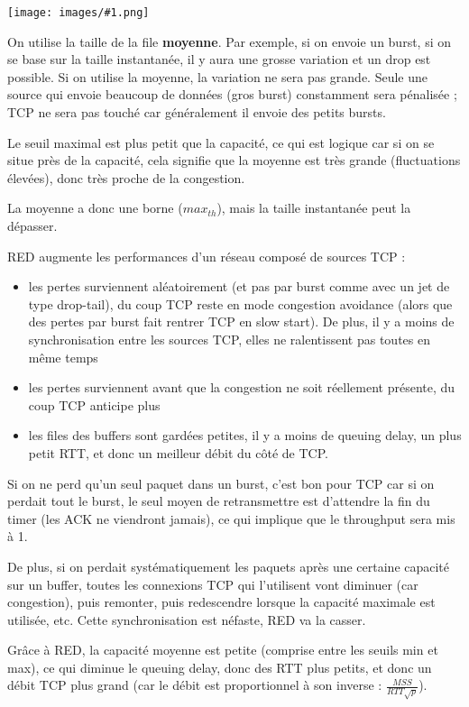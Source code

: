 \documentclass[10pt,a4paper]{report}
\newcommand{\dessin}[1]{\begin{center}\texttt{[image: images/\#1.png]}\end{center}}
\begin{document}
			\dessin{111}
			
			On utilise la taille de la file \textbf{moyenne}. Par exemple, si on envoie un burst, si on se base sur la taille instantanée, il y aura une grosse variation et un drop est possible. Si on utilise la moyenne, la variation ne sera pas grande. Seule une source qui envoie beaucoup de données (gros burst) constamment sera pénalisée ; TCP ne sera pas touché car généralement il envoie des petits bursts.
			
			Le seuil maximal est plus petit que la capacité, ce qui est logique car si on se situe près de la capacité, cela signifie que la moyenne est très grande (fluctuations élevées), donc très proche de la congestion.
			
			La moyenne a donc une borne ($max_{th}$), mais la taille instantanée peut la dépasser.
			
			RED augmente les performances d'un réseau composé de sources TCP :
			
			\begin{itemize}
				\item les pertes surviennent aléatoirement (et pas par burst comme avec un jet de type drop-tail), du coup TCP reste en mode congestion avoidance (alors que des pertes par burst fait rentrer TCP en slow start). De plus, il y a moins de synchronisation entre les sources TCP, elles ne ralentissent pas toutes en même temps
				
				\item les pertes surviennent avant que la congestion ne soit réellement présente, du coup TCP anticipe plus
				\item les files des buffers sont gardées petites, il y a moins de queuing delay, un plus petit RTT, et donc un meilleur débit du côté de TCP.
			\end{itemize}
			
			Si on ne perd qu'un seul paquet dans un burst, c'est bon pour TCP car si on perdait tout le burst, le seul moyen de retransmettre est d'attendre la fin du timer (les ACK ne viendront jamais), ce qui implique que le throughput sera mis à 1.
			
			De plus, si on perdait systématiquement les paquets après une certaine capacité sur un buffer, toutes les connexions TCP qui l'utilisent vont diminuer (car congestion), puis remonter, puis redescendre lorsque la capacité maximale est utilisée, etc. Cette synchronisation est néfaste, RED va la casser.
			
			Grâce à RED, la capacité moyenne est petite (comprise entre les seuils min et max), ce qui diminue le queuing delay, donc des RTT plus petits, et donc un débit TCP plus grand (car le débit est proportionnel à son inverse : $\frac{MSS}{RTT \sqrt{p}}$).
			
\end{document}
